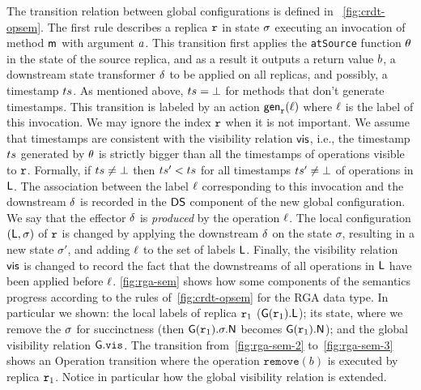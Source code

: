 The transition relation between global configurations is defined in
\figurename~\ref{fig:crdt-opsem}.
The first rule describes a replica $\mathtt{r}$ in state $\sigma$
executing an invocation of method $\mathsf{m}$ with argument $a$.
This transition first applies the {\tt atSource} function $\theta$
in the state of the source replica, and as a result it outputs a
return value $b$, a downstream state transformer $\delta$
to be applied on all replicas, and possibly, a timestamp $ts$.
As mentioned above, $ts=\bot$ for methods that don't generate
timestamps. This transition is labeled by an action $\mathsf{gen}_{\mathtt{r}}(\ell)$ where
$\ell$ is the label of this invocation. We may ignore the index $\mathtt{r}$ when it is not important.
We assume that timestamps are consistent with the visibility relation
$\mathsf{vis}$, i.e., the timestamp $ts$ generated by $\theta$ is strictly bigger than
all the timestamps of operations visible to $\mathtt{r}$. Formally, if $ts\neq\bot$ then $ts' < ts$ for all timestamps
$ts'\neq\bot$ of operations in $\mathsf{L}$.
The association between the label $\ell$ corresponding to this
invocation and the downstream $\delta$ is recorded in the
$\mathsf{DS}$ component of the new global configuration.
We say that the effector $\delta$ is \emph{produced} by the operation $\ell$.
The local configuration $(\mathsf{L},\sigma)$ of $\mathtt{r}$ is changed by
applying the downstream $\delta$ on the state $\sigma$, resulting
in a new state $\sigma'$, and adding $\ell$ to the set of labels
$\mathsf{L}$.
Finally, the visibility relation $\mathsf{vis}$ is changed to record the
fact that the downstreams of all operations in $\mathsf{L}$ have been
applied before $\ell$.
%
\autoref{fig:rga-sem} shows how some components of the semantics
progress according to the rules of~\autoref{fig:crdt-opsem} for the
RGA data type.
%
In particular we shown: the local labels of replica $\mathtt{r}_1$
($\mathsf{G}(\mathtt{r}_1).\mathsf{L}$); its state, where we remove the
$\sigma$ for succinctness (then $\mathsf{G}(\mathtt{r}_1).\sigma.\mathsf{N}$
becomes $\mathsf{G}(\mathtt{r}_1).\mathsf{N}$); and the global visibility
relation $\mathsf{G}.\mathtt{vis}$.
%
The transition from~\autoref{fig:rga-sem-2} to~\autoref{fig:rga-sem-3}
shows an {\sc Operation} transition where the operation
$\mathtt{remove}(b)$ is executed by replica $\mathtt{r}_1$.
%
Notice in particular how the global visibility relation is extended.


